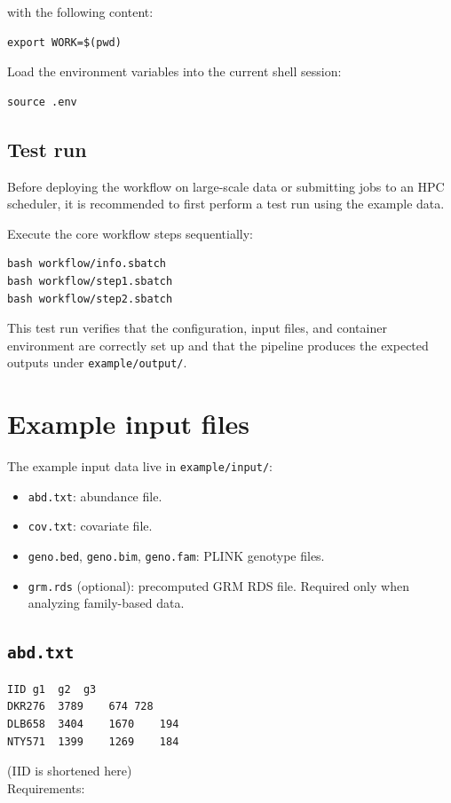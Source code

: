 \documentclass[11pt]{article}
\begin{document}
with the following content:

\begin{verbatim}
export WORK=$(pwd)
\end{verbatim}

Load the environment variables into the current shell session:

\begin{verbatim}
source .env
\end{verbatim}

\subsection{Test run}

Before deploying the workflow on large-scale data or submitting jobs to an
HPC scheduler, it is recommended to first perform a test run using the
example data.

Execute the core workflow steps sequentially:

\begin{verbatim}
bash workflow/info.sbatch
bash workflow/step1.sbatch
bash workflow/step2.sbatch
\end{verbatim}

This test run verifies that the configuration, input files, and container
environment are correctly set up and that the pipeline produces the expected
outputs under \texttt{example/output/}.




\section{Example input files}

The example input data live in \texttt{example/input/}:

\begin{itemize}[nosep]
  \item \texttt{abd.txt}: abundance file.
  \item \texttt{cov.txt}: covariate file.
  \item \texttt{geno.bed}, \texttt{geno.bim}, \texttt{geno.fam}:
        PLINK genotype files.
  \item \texttt{grm.rds} (optional): precomputed GRM RDS file. 
        Required only when analyzing family-based data.
\end{itemize}

\subsection{\texttt{abd.txt}}
\begin{verbatim}
IID	g1	g2	g3
DKR276	3789	674	728
DLB658	3404	1670	194
NTY571	1399	1269	184
\end{verbatim}
(IID is shortened here) \\
Requirements:
\end{document}
